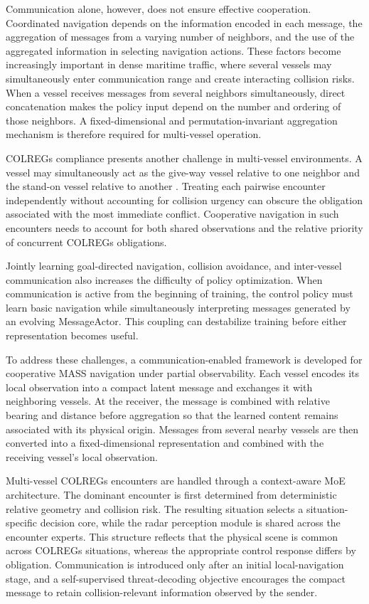 \documentclass[final,5p,times,twocolumn]{elsarticle}
\begin{document}
{Communication alone, however, does not ensure effective cooperation. Coordinated navigation depends on the information encoded in each message, the aggregation of messages from a varying number of neighbors, and the use of the aggregated information in selecting navigation actions. These factors become increasingly important in dense maritime traffic, where several vessels may simultaneously enter communication range and create interacting collision risks. When a vessel receives messages from several neighbors simultaneously, direct concatenation makes the policy input depend on the number and ordering of those neighbors. A fixed-dimensional and permutation-invariant aggregation mechanism is therefore required for multi-vessel operation.

COLREGs compliance presents another challenge in multi-vessel environments. A vessel may simultaneously act as the give-way vessel relative to one neighbor and the stand-on vessel relative to another \citep{Complexity}. Treating each pairwise encounter independently without accounting for collision urgency can obscure the obligation associated with the most immediate conflict. Cooperative navigation in such encounters needs to account for both shared observations and the relative priority of concurrent COLREGs obligations.

Jointly learning goal-directed navigation, collision avoidance, and inter-vessel communication also increases the difficulty of policy optimization. When communication is active from the beginning of training, the control policy must learn basic navigation while simultaneously interpreting messages generated by an evolving MessageActor. This coupling can destabilize training before either representation becomes useful.

To address these challenges, a communication-enabled framework is developed for cooperative MASS navigation under partial observability. Each vessel encodes its local observation into a compact latent message and exchanges it with neighboring vessels. At the receiver, the message is combined with relative bearing and distance before aggregation so that the learned content remains associated with its physical origin. Messages from several nearby vessels are then converted into a fixed-dimensional representation and combined with the receiving vessel's local observation.

Multi-vessel COLREGs encounters are handled through a context-aware MoE architecture. The dominant encounter is first determined from deterministic relative geometry and collision risk. The resulting situation selects a situation-specific decision core, while the radar perception module is shared across the encounter experts. This structure reflects that the physical scene is common across COLREGs situations, whereas the appropriate control response differs by obligation. Communication is introduced only after an initial local-navigation stage, and a self-supervised threat-decoding objective encourages the compact message to retain collision-relevant information observed by the sender.

}
\end{document}
